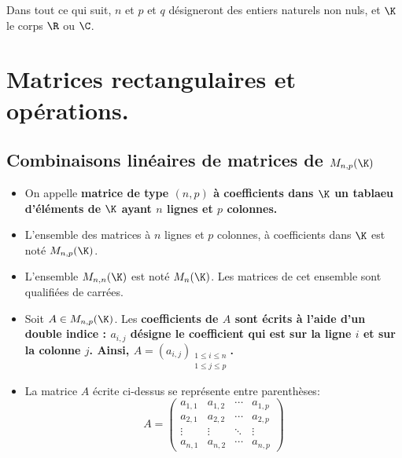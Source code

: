 \documentclass[11pt]{article}
\begin{document}


\thispagestyle{fancy}

Dans tout ce qui suit, $n$ et $p$ et $q$ désigneront des entiers naturels non nuls, et $\K$ le corps $\R$ ou $\C$.

\section{Matrices rectangulaires et opérations.}

\subsection{Combinaisons linéaires de matrices de \texorpdfstring{$M_{n,p}(\K)$}{Lg}}

\begin{defi}{}{}
    \begin{itemize}
        \item On appelle \bf{matrice} de type $(n,p)$ à coefficients dans $\K$ un tablaeu d'éléments de $\K$ ayant $n$ lignes et $p$ colonnes.
        \item L'ensemble des matrices à $n$ lignes et $p$ colonnes, à coefficients dans $\K$ est noté $M_{n,p}(\K)$.
        \item L'ensemble $M_{n,n}(\K)$ est noté $M_n(\K)$. Les matrices de cet ensemble sont qualifiées de carrées.
        \item Soit $A\in M_{n,p}(\K)$. Les \bf{coefficients} de $A$ sont écrits à l'aide d'un double indice : $a_{i,j}$ désigne le coefficient qui est sur la ligne $i$ et sur la colonne $j$. Ainsi, $A=(a_{i,j})_{\substack{1\leq i \leq n\\1\leq j \leq p}}$.
        \item La matrice $A$ écrite ci-dessus se représente entre parenthèses:
        \begin{equation*}
            A = \begin{pmatrix}
                a_{1,1} & a_{1,2} & \cdots & a_{1,p} \\
                a_{2,1} & a_{2,2} & \cdots & a_{2,p} \\
                \vdots & \vdots & \ddots & \vdots \\
                a_{n,1} & a_{n,2} & \cdots & a_{n,p}
            \end{pmatrix}
        \end{equation*}
    \end{itemize}
\end{defi}
\end{document}
